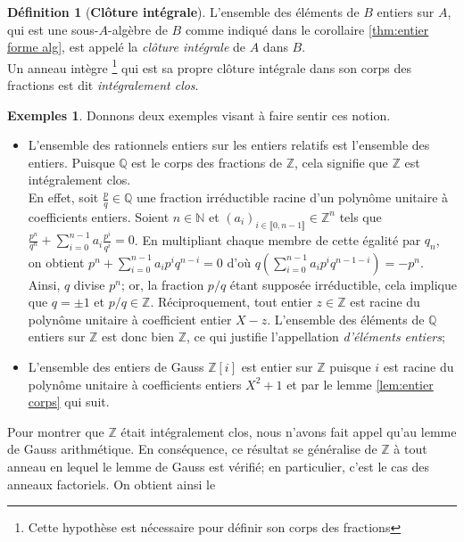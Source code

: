 \documentclass[10pt, twoside]{article}
\theoremstyle{plain}
\theoremstyle{definition}
\newtheorem{definition}[theorem]{Définition}
\theoremstyle{plain}
\theoremstyle{plain}
\theoremstyle{definition}
\newtheorem*{example}{Exemples}
\theoremstyle{remark}
\begin{document}

\begin{definition}[\textbf{Clôture intégrale}]\label{def:clôt int}
    L'ensemble des éléments de $B$ entiers sur $A$, qui est une sous-$A$-algèbre de $B$ comme indiqué dans le corollaire \ref{thm:entier forme alg}, est appelé la \textit{clôture intégrale}  de $A$ dans $B$.\\
    Un anneau intègre \footnote{Cette hypothèse est nécessaire pour définir son corps des fractions} qui est sa propre clôture intégrale dans son corps des fractions est dit \textit{intégralement clos}.
\end{definition}

\begin{example}
    Donnons deux exemples visant à faire sentir ces notion.
    \begin{itemize}
        \item L'ensemble des rationnels entiers sur les entiers relatifs est l'ensemble des entiers. Puisque $\mathbb{Q}$ est le corps des fractions de $\mathbb{Z}$, cela signifie que $\mathbb{Z}$ est intégralement clos.\\
        En effet, soit $\frac{p}{q} \in \mathbb{Q}$ une fraction irréductible racine d'un polynôme unitaire à coefficients entiers. Soient $n \in \mathbb{N}$ et $(a_i)_{i \in \llbracket 0, n-1 \rrbracket} \in \mathbb{Z}^n$ tels que $\frac{p^n}{q^n} + \sum\limits_{i=0}^{n-1} a_i \frac{p^i}{q^i} = 0$. En multipliant chaque membre de cette égalité par $q_n$, on obtient $p^n + \sum\limits_{i=0}^{n-1}a_i p^i q^{n-i} = 0$ d'où $q(\sum\limits_{i=0}^{n-1}a_i p^i q^{n-1-i}) = -p^n$. Ainsi, $q$ divise $p^n$; or, la fraction $p/q$ étant supposée irréductible, cela implique que $q = \pm 1$ et $p/q \in \mathbb{Z}$. Réciproquement, tout entier $z \in \mathbb{Z}$ est racine du polynôme unitaire à coefficient entier $X - z$. L'ensemble des éléments de $\mathbb{Q}$ entiers sur $\mathbb{Z}$ est donc bien $\mathbb{Z}$, ce qui justifie l'appellation \textit{d'éléments entiers};
        \item L'ensemble des entiers de Gauss $\mathbb{Z}[i]$ est entier sur $\mathbb{Z}$ puisque $i$ est racine du polynôme unitaire à coefficients entiers $X^2 + 1$ et par le lemme \ref{lem:entier corps} qui suit.
    \end{itemize}  
\end{example}

Pour montrer que $\mathbb{Z}$ était intégralement clos, nous n'avons fait appel qu'au lemme de Gauss arithmétique. En conséquence, ce résultat se généralise de $\mathbb{Z}$ à tout anneau en lequel le lemme de Gauss est vérifié; en particulier, c'est le cas des anneaux factoriels. On obtient ainsi le
\end{document}
